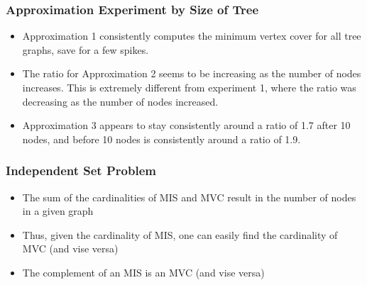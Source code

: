 \documentclass[12pt]{article}
\begin{document}
\subsubsection{Approximation Experiment by Size of Tree}  
  \begin{itemize}
      \item Approximation 1 consistently computes the minimum vertex cover for all tree graphs, save for a few spikes.
      \item The ratio for Approximation 2 seems to be increasing as the number of nodes increases. This is extremely different from experiment 1, where the ratio was decreasing as the number of nodes increased.
      \item Approximation 3 appears to stay consistently around a ratio of 1.7 after 10 nodes, and before 10 nodes is consistently around a ratio of 1.9.
  \end{itemize}
  

\subsubsection{Independent Set Problem}
  \begin{itemize}
    \item The sum of the cardinalities of MIS and MVC result in the number of nodes in a given graph
    \item Thus, given the cardinality of MIS, one can easily find the cardinality of MVC (and vise versa)
    \item The complement of an MIS is an MVC (and vise versa)
  \end{itemize}
\end{document}
